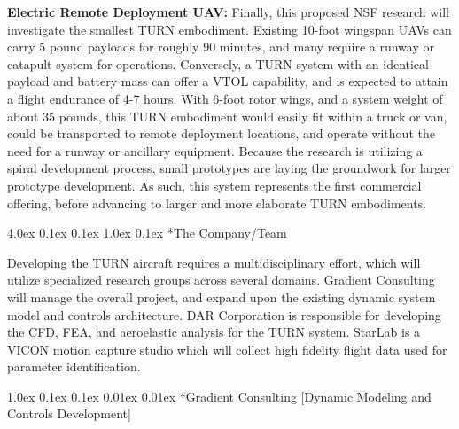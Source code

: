 \documentclass[11pt]{article}
\makeatletter
\renewcommand\section{
\@startsection{section}{1}{\z@}%
{4.0ex \@plus 0.1ex \@minus 0.1ex}%
{1.0ex \@plus 0.1ex}%
{\normalfont\LARGE\bfseries}}
\renewcommand\subsection{
\@startsection{subsection}{2}{\z@}%
{1.0ex \@plus 0.1ex \@minus 0.1ex}%
{0.01ex \@plus 0.01ex}%
{\normalfont\Large\bfseries}}
\makeatother
\begin{document}
{\bf Electric Remote Deployment UAV:}
Finally, this proposed NSF research will investigate the smallest TURN embodiment.  Existing 10-foot wingspan UAVs can carry 5 pound payloads for roughly 90 minutes, and many require a runway or catapult system for operations.  Conversely, a TURN system with an identical payload and battery mass can offer a VTOL capability, and is expected to attain a flight endurance of 4-7 hours.  With 6-foot rotor wings, and a system weight of about 35 pounds, this TURN embodiment would easily fit within a truck or van, could be transported to remote deployment locations, and operate without the need for a runway or ancillary equipment.  Because the research is utilizing a spiral development process, small prototypes are laying the groundwork for larger prototype development.  As such, this system represents the first commercial offering, before advancing to larger and more elaborate TURN embodiments.








\section*{The Company/Team}

Developing the TURN aircraft requires a multidisciplinary effort, which will utilize specialized research groups across several domains.  Gradient Consulting will manage the overall project, and expand upon the existing dynamic system model and controls architecture.  DAR Corporation is responsible for developing the CFD, FEA, and aeroelastic analysis for the TURN system.  StarLab is a VICON motion capture studio which will collect high fidelity flight data used for parameter identification.




\subsection*{Gradient Consulting [Dynamic Modeling and Controls Development]}
\end{document}
